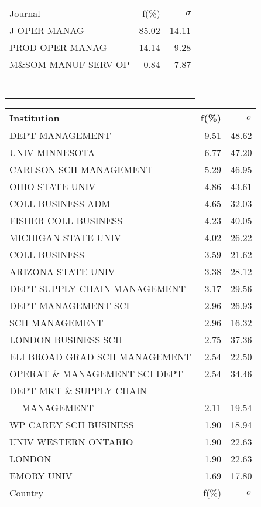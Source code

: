 \documentclass[a4paper,11pt]{report}
\begin{document}
\begin{landscape}
\begin{table}[!ht]
{\begin{tabular}{|l r r|}
 &  & \\
\hline
\hline
Journal & f(\%) & $\sigma$\\
\hline
J OPER MANAG & 85.02 & 14.11\\
PROD OPER MANAG & 14.14 & -9.28\\
M\&SOM-MANUF SERV OP & 0.84 & -7.87\\
 &  & \\
 &  & \\
 &  & \\
 &  & \\
 &  & \\
 &  & \\
 &  & \\
\hline
\end{tabular}
}
{\scriptsize\begin{tabular}{|l r r|}
\hline
Institution & f(\%) & $\sigma$\\
\hline
DEPT MANAGEMENT & 9.51 & 48.62\\
UNIV MINNESOTA & 6.77 & 47.20\\
CARLSON SCH MANAGEMENT & 5.29 & 46.95\\
OHIO STATE UNIV & 4.86 & 43.61\\
COLL BUSINESS ADM & 4.65 & 32.03\\
FISHER COLL BUSINESS & 4.23 & 40.05\\
MICHIGAN STATE UNIV & 4.02 & 26.22\\
COLL BUSINESS & 3.59 & 21.62\\
ARIZONA STATE UNIV & 3.38 & 28.12\\
DEPT SUPPLY CHAIN MANAGEMENT & 3.17 & 29.56\\
DEPT MANAGEMENT SCI & 2.96 & 26.93\\
SCH MANAGEMENT & 2.96 & 16.32\\
LONDON BUSINESS SCH & 2.75 & 37.36\\
ELI BROAD GRAD SCH MANAGEMENT & 2.54 & 22.50\\
OPERAT \& MANAGEMENT SCI DEPT & 2.54 & 34.46\\
DEPT MKT \& SUPPLY CHAIN &  & \\
$\quad$ MANAGEMENT & 2.11 & 19.54\\
WP CAREY SCH BUSINESS & 1.90 & 18.94\\
UNIV WESTERN ONTARIO & 1.90 & 22.63\\
LONDON & 1.90 & 22.63\\
EMORY UNIV & 1.69 & 17.80\\
\hline
\hline
Country & f(\%) & $\sigma$\\

\end{tabular}}
\end{table}
\end{landscape}
\end{document}
